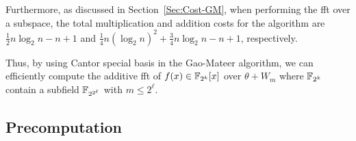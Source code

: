 
Furthermore, as discussed in Section~\ref{Sec:Cost-GM}, when performing the \gls{fft} over a subspace, the total multiplication and addition costs for the algorithm are $\frac{1}{2}n\log_2n - n+1$ and $\frac{1}{4}n(\log_2n)^2 + \frac{3}{4}n\log_2n - n +1$, respectively.

Thus, by using Cantor special basis in the Gao-Mateer algorithm, we can efficiently compute the additive \gls{fft} of $f(x)\in {\mathbb F}_{2^k}[x]$ over $\theta + W_m$ where ${\mathbb F}_{2^k}$ contain a subfield ${\mathbb F}_{2^{2^\ell}}$ with $m \leq 2^{\ell}$.




\subsection{Precomputation}\label{sec:gao-precmp}

